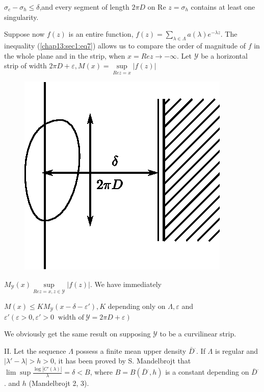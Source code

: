  \begin{theorem*}
 $\sigma_c - \sigma_h \le \delta$,\pageoriginale and every segment of length $2
 \pi D$ on Re $z = \sigma_h$ contains at least one singularity. 
 \end{theorem*}

 Suppose now $f (z)$ is an entire function, $f (z) = \sum\limits_{
 \lambda \in \Lambda} a(\lambda) e^{- \lambda z}$. The
 inequality (\ref{chap13:sec1:eq7}) allows us to compare the order of magnitude of $f$
 in the whole plane and in the strip, when $x =Re z \to -
 \infty$. Let $\mathscr{Y}$ be a horizontal strip of width $2 \pi D
 + \varepsilon, M (x) = \sup\limits_{ Rez=x} |f (z)|$ 
\begin{figure}[H]
\centerline{\includegraphics{vol15-figures/fig15-7.eps}}
\end{figure}

 $M_\mathscr{Y} (x) \sup\limits_{ Rez=x, z \in \mathscr{Y}}
 |f (z)|$. We have immediately 
 \begin{theorem*}
 $M (x) \le K M_\mathscr{Y} (x - \delta - \varepsilon ' ), K$
 depending only on $\Lambda, \varepsilon$ and $\varepsilon '
 (\varepsilon > 0, \varepsilon ' > 0 ~\text{ width of}~ \mathscr{Y} = 2
 \pi D + \varepsilon)$ 
 \end{theorem*}

 We obviously get the same result on supposing $\mathscr{Y}$ to be a
 curvilinear strip. 

\noindent II. Let the sequence $\Lambda$ possess a finite mean upper
density $\bar{D}^.$. 
 If $\Lambda$ is regular and $\big| \lambda' - \lambda \big| > h > 0$,
 it has been proved by S. Mandelbrojt that $\lim \sup \frac{ \log |C'
 (\lambda)|} {\lambda} = \delta < B$, where $B = B (\bar{D}^., h)$ is
 a constant depending on $\bar{D}^.$. and $h$ (Mandelbrojt 2, 3). 

